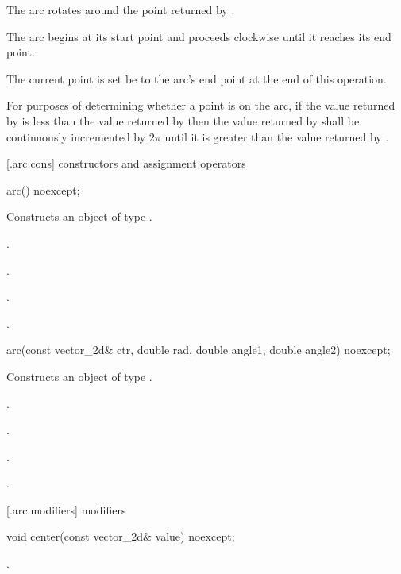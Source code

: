 \pnum
The arc rotates around the point returned by .

\pnum
The arc begins at its start point and proceeds clockwise until it reaches its end point.

\pnum
The current point is set be to the arc's end point at the end of this operation.

\pnum
For purposes of determining whether a point is on the arc, if the value returned by  is less than the value returned by  then the value returned by  shall be continuously incremented by $2\pi$ until it is greater than the value returned by .

 [\iotwod.arc.cons] { constructors and assignment operators}

\begin{itemdecl}
    arc() noexcept;
\end{itemdecl}
\begin{itemdescr}
	\pnum
	\effects
	Constructs an object of type .
	
	\pnum
	\postconditions
	.

	.

	.

	.

\end{itemdescr}

\begin{itemdecl}
    arc(const vector_2d& ctr, double rad, double angle1, double angle2) noexcept;
\end{itemdecl}
\begin{itemdescr}
	\pnum
	\effects
	Constructs an object of type .
	
	\pnum
	\postconditions
	.

	.

	.

	.

\end{itemdescr}

 [\iotwod.arc.modifiers]{ modifiers}

\begin{itemdecl}
    void center(const vector_2d& value) noexcept;
\end{itemdecl}
\begin{itemdescr}
	\pnum
	\postconditions
	.
	
\end{itemdescr}

